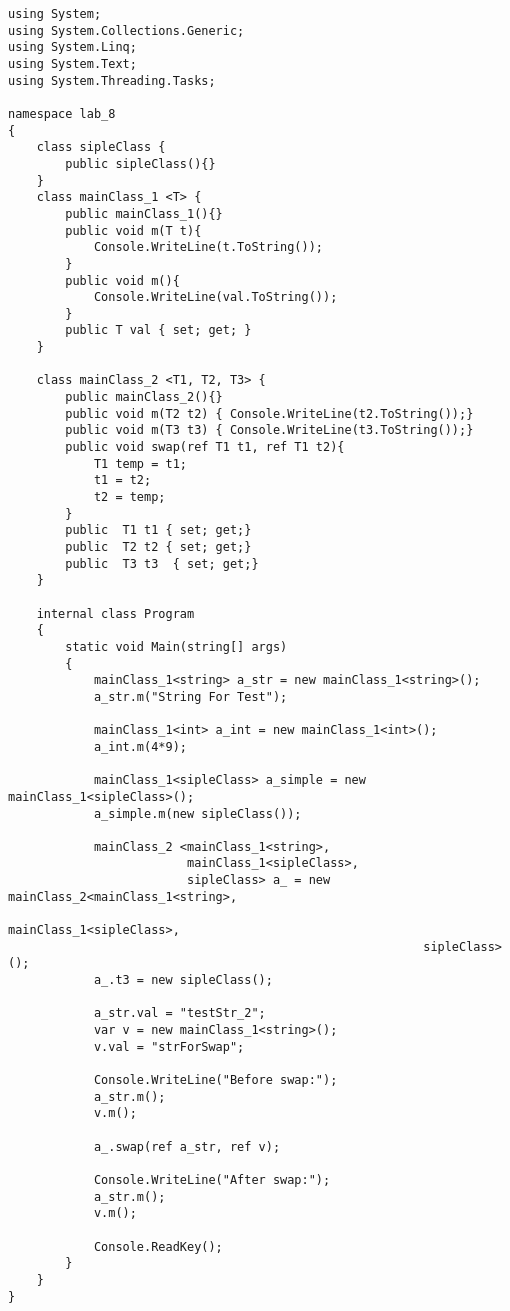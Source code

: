 \begin{lstlisting}[language={[Sharp]C}]
using System;
using System.Collections.Generic;
using System.Linq;
using System.Text;
using System.Threading.Tasks;

namespace lab_8
{
    class sipleClass {
        public sipleClass(){}
    }
    class mainClass_1 <T> {
        public mainClass_1(){}
        public void m(T t){
            Console.WriteLine(t.ToString());
        }
        public void m(){ 
            Console.WriteLine(val.ToString()); 
        }
        public T val { set; get; }
    }

    class mainClass_2 <T1, T2, T3> {
        public mainClass_2(){}
        public void m(T2 t2) { Console.WriteLine(t2.ToString());}
        public void m(T3 t3) { Console.WriteLine(t3.ToString());}
        public void swap(ref T1 t1, ref T1 t2){
            T1 temp = t1;
            t1 = t2;
            t2 = temp;
        }
        public  T1 t1 { set; get;}
        public  T2 t2 { set; get;}
        public  T3 t3  { set; get;}
    }

    internal class Program
    {
        static void Main(string[] args)
        {
            mainClass_1<string> a_str = new mainClass_1<string>();
            a_str.m("String For Test");
            
            mainClass_1<int> a_int = new mainClass_1<int>();
            a_int.m(4*9);

            mainClass_1<sipleClass> a_simple = new mainClass_1<sipleClass>();
            a_simple.m(new sipleClass());

            mainClass_2 <mainClass_1<string>, 
                         mainClass_1<sipleClass>, 
                         sipleClass> a_ = new mainClass_2<mainClass_1<string>, 
                                                          mainClass_1<sipleClass>, 
                                                          sipleClass>();
            a_.t3 = new sipleClass();

            a_str.val = "testStr_2";
            var v = new mainClass_1<string>();
            v.val = "strForSwap";

            Console.WriteLine("Before swap:");
            a_str.m();
            v.m();
            
            a_.swap(ref a_str, ref v);

            Console.WriteLine("After swap:");
            a_str.m();
            v.m();
           
            Console.ReadKey();
        }
    }
}

\end{lstlisting}